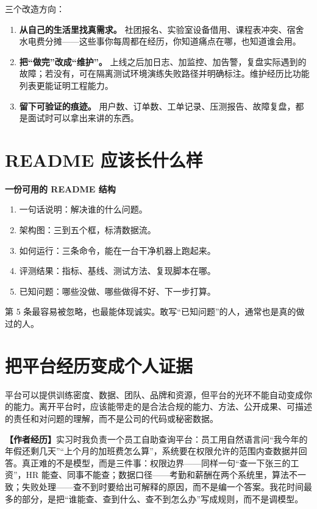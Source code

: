 \documentclass[UTF8,zihao=5,openany]{ctexbook}
\begin{document}
三个改造方向：

\begin{enumerate}
\item \textbf{从自己的生活里找真需求。} 社团报名、实验室设备借用、课程表冲突、宿舍水电费分摊——这些事你每周都在经历，你知道痛点在哪，也知道谁会用。
\item \textbf{把“做完”改成“维护”。} 上线之后加日志、加监控、加告警，复盘实际遇到的故障；若没有，可在隔离测试环境演练失败路径并明确标注。维护经历比功能列表更能证明工程能力。
\item \textbf{留下可验证的痕迹。} 用户数、订单数、工单记录、压测报告、故障复盘，都是面试时可以拿出来讲的东西。
\end{enumerate}

\section{README 应该长什么样}
\begin{toolbox}
\textbf{一份可用的 README 结构}\par\smallskip
\begin{enumerate}
\item 一句话说明：解决谁的什么问题。
\item 架构图：三到五个框，标清数据流。
\item 如何运行：三条命令，能在一台干净机器上跑起来。
\item 评测结果：指标、基线、测试方法、复现脚本在哪。
\item 已知问题：哪些没做、哪些做得不好、下一步打算。
\end{enumerate}
\end{toolbox}

第 5 条最容易被忽略，也最能体现诚实。敢写“已知问题”的人，通常也是真的做过的人。


\section{把平台经历变成个人证据}
平台可以提供训练密度、数据、团队、品牌和资源，但平台的光环不能自动变成你的能力。离开平台时，应该能带走的是合法合规的能力、方法、公开成果、可描述的责任和对问题的理解，而不是公司的代码或秘密数据。

\begin{casebox}
\textbf{【作者经历】}实习时我负责一个员工自助查询平台：员工用自然语言问“我今年的年假还剩几天”“上个月的加班费怎么算”，系统要在权限允许的范围内查数据并回答。真正难的不是模型，而是三件事：权限边界——同样一句“查一下张三的工资”，HR 能查、同事不能查；数据口径——考勤和薪酬在两个系统里，算法不一致；失败处理——查不到时要给出可解释的原因，而不是编一个答案。我花时间最多的部分，是把“谁能查、查到什么、查不到怎么办”写成规则，而不是调模型。
\end{casebox}
\end{document}

